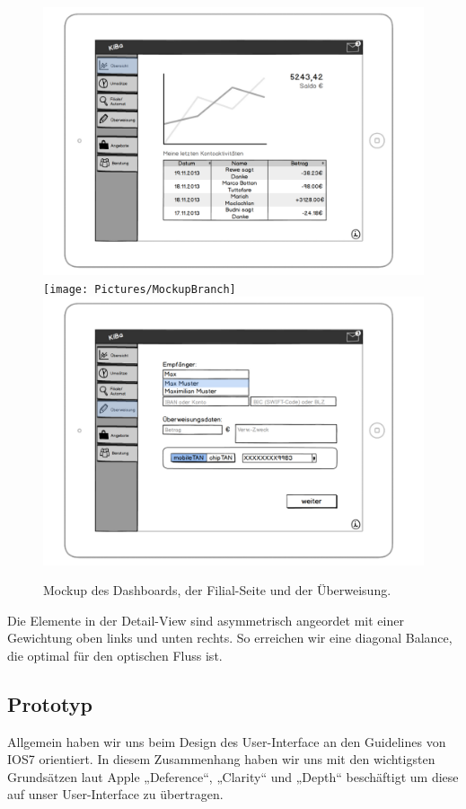 \begin{figure}[p]
	\centering
	\includegraphics[scale=.52]{Pictures/MockupDashboard}\\
	\texttt{[image: Pictures/MockupBranch]}\\
	\includegraphics[scale=.52]{Pictures/MockupTransition}
	\caption{Mockup des Dashboards, der Filial-Seite und der Überweisung.}
\end{figure}

	Die Elemente in der Detail-View sind asymmetrisch angeordet mit einer Gewichtung oben links und unten rechts. So erreichen wir eine diagonal Balance, die optimal für den optischen Fluss ist.

\subsection{Prototyp}
	Allgemein haben wir uns beim Design des User-Interface an den Guidelines von IOS7 orientiert. In diesem Zusammenhang haben wir uns mit den wichtigsten Grundsätzen laut Apple „Deference“, „Clarity“ und „Depth“ beschäftigt um diese auf unser User-Interface zu übertragen. 
	
